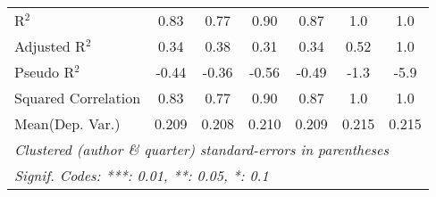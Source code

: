 \begin{tabular}{lcccccc}
   R$^2$                                                      & 0.83          & 0.77          & 0.90    & 0.87      & 1.0            & 1.0\\  
   Adjusted R$^2$                                             & 0.34          & 0.38          & 0.31    & 0.34      & 0.52           & 1.0\\  
   Pseudo R$^2$                                               & -0.44         & -0.36         & -0.56   & -0.49     & -1.3           & -5.9\\  
   Squared Correlation                                        & 0.83          & 0.77          & 0.90    & 0.87      & 1.0            & 1.0\\  
Mean(Dep. Var.) & 0.209 & 0.208 & 0.210 & 0.209 & 0.215 & 0.215 \\
   \midrule \midrule
   \multicolumn{7}{l}{\emph{Clustered (author \& quarter) standard-errors in parentheses}}\\
   \multicolumn{7}{l}{\emph{Signif. Codes: ***: 0.01, **: 0.05, *: 0.1}}\\
\end{tabular}
\par\endgroup
